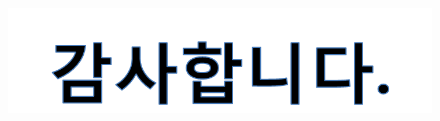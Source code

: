 \documentclass[10pt,compress,slidetop,%
			   hyperref={unicode},xcolor={svgnames},%
			   t]{beamer}
\begin{document}
%
\begin{frame}
	\frametitle{}
	  	\begin{figure}
	\centering
	 \includegraphics[width=1.00\textwidth]{thanks.png}
	\end{figure}	
	
\end{frame}
\end{document}
